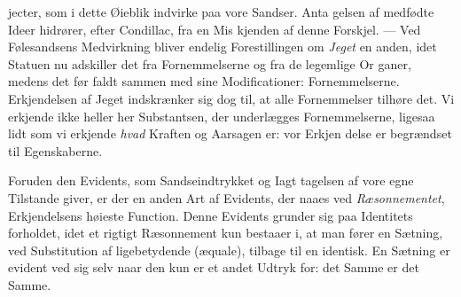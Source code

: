 \documentclass[12pt,a4paper]{book}
\begin{document}
jecter, som i dette Øieblik indvirke paa vore Sandser. Anta\-%
gelsen af medfødte Ideer hidrører, efter Condillac, fra en Mis\-%
kjenden af denne Forskjel. --- Ved Følesandsens Medvirkning
bliver endelig Forestillingen om \emph{Jeget} en anden, idet Statuen
nu adskiller det fra Fornemmelserne og fra de legemlige Or\-%
ganer, medens det før faldt sammen med sine Modificationer:
Fornemmelserne. Erkjendelsen af Jeget indskrænker sig dog
til, at alle Fornemmelser tilhøre det. Vi erkjende ikke heller
her Substantsen, der underlægges Fornemmelserne, ligesaa lidt
som vi erkjende \emph{hvad} Kraften og Aarsagen er: vor Erkjen\-%
delse er begrændset til Egenskaberne.

Foruden den Evidents, som Sandseindtrykket og Iagt\-%
tagelsen af vore egne Tilstande giver, er der en anden Art af
Evidents, der naaes ved \emph{Ræsonnementet}, Erkjendelsens
høieste Function. Denne Evidents grunder sig paa Identitets\-%
forholdet, idet et rigtigt Ræsonnement kun bestaaer i, at man
fører en Sætning, ved Substitution af ligebetydende (æquale),
tilbage til en identisk. En Sætning er evident ved sig selv naar
den kun er et andet Udtryk for: det Samme er det Samme.
\end{document}
